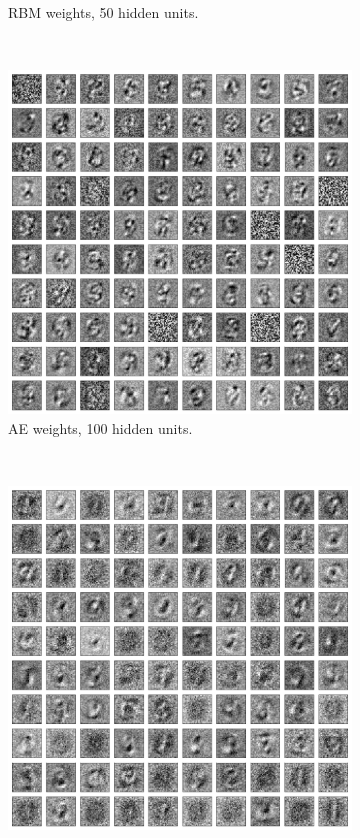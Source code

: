 \documentclass{article}
\begin{document}
\begin{figure}[!ht]
\begin{subfigure}[t]{0.47\textwidth}
    \caption{RBM weights, 50 hidden units.}
    \label{fig:w50rbm}
  \end{subfigure}
  \addtocounter{subfigure}{-2}
  ~
  \begin{subfigure}[t]{0.47\textwidth}
    \centering
    \includegraphics[width=\textwidth]{../plots/3_1_2/last_layer_100_components_100e.png}
    \caption{AE weights, 100 hidden units.}
    \label{fig:w100ae}
  \end{subfigure}
  \addtocounter{subfigure}{1}
  ~
  \begin{subfigure}[t]{0.47\textwidth}
    \centering
    \includegraphics[width=\textwidth]{../plots/3_1_2/rbm_last_layer_100_components_20e.png}

\end{subfigure}
\end{figure}
\end{document}
